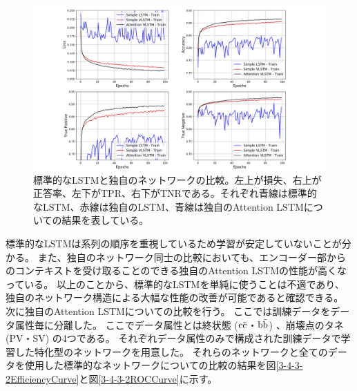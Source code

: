 \begin{table}[htb]
 \centering
　\small
  \label{ParametersforVLSTMModel}
\end{table}

\begin{figure}[htbp]
 \centering
 \includegraphics[trim = 100 0 100 0, width=1.0\textwidth, clip]{Figure/3Networks/3-4-3-1LSTMvsVLSTM.png}
 \caption[標準的なLSTMと独自のネットワークの比較]{標準的なLSTMと独自のネットワークの比較。左上が損失、右上が正答率、左下がTPR、右下がTNRである。それぞれ青線は標準的なLSTM、赤線は独自のLSTM、青線は独自のAttention LSTMについての結果を表している。}
 \label{3-4-3-1LSTMvsVLSTM}
\end{figure}

標準的なLSTMは系列の順序を重視しているため学習が安定していないことが分かる。
また、独自のネットワーク同士の比較においても、エンコーダー部からのコンテキストを受け取ることのできる独自のAttention LSTMの性能が高くなっている。
以上のことから、標準的なLSTMを単純に使うことは不適であり、独自のネットワーク構造による大幅な性能の改善が可能であると確認できる。\\

次に独自のAttention LSTMについての比較を行う。
ここでは訓練データをデータ属性毎に分離した。
ここでデータ属性とは終状態 ($\rm c\bar{c}$・$\rm b\bar{b}$) 、崩壊点のタネ (PV・SV) の4つである。
それぞれデータ属性のみで構成された訓練データで学習した特化型のネットワークを用意した。
それらのネットワークと全てのデータを使用した標準的なネットワークについての比較の結果を図\ref{3-4-3-2EfficiencyCurve}と図\ref{3-4-3-2ROCCurve}に示す。

